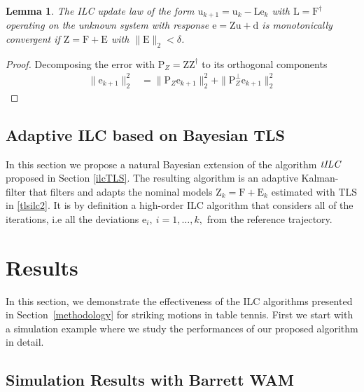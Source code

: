 \documentclass[10pt,a4paper]{article}
\theoremstyle{plain}
\newtheorem{lem}{Lemma}
\theoremstyle{definition}
\newcommand{\boldvec}[1]{\boldsymbol{\mathrm{#1}}}
\let\vec\boldvec
\newcommand{\error}{\vec{e}} %
\newcommand{\linDist}{\vec{d}} %
\newcommand{\sysInput}{\vec{u}} %
\newcommand{\latentMat}{\vec{Z}} %
\newcommand{\errorMat}{\vec{E}} %
\newcommand{\lmatrix}{\vec{L}} %
\newcommand{\systemMat}{\vec{F}} %
\newcommand{\projOrth}{\vec{P}_{Z}^{\perp}} %
\newcommand{\proj}{\vec{P}_{Z}} %
\newcommand{\alg}{\emph{tILC}}
\begin{document}
\begin{lem}
The ILC update law of the form $\sysInput_{k+1} = \sysInput_{k} - \lmatrix \error_{k}$ with $\lmatrix = \systemMat^{\dagger}$ operating on the unknown system with response $\error = \latentMat \sysInput + \linDist$ is monotonically convergent if $\latentMat = \systemMat + \errorMat$ with $\|\errorMat\|_2 < \delta$. 
\end{lem}
%
\begin{proof}
Decomposing the error with $\proj = \latentMat\latentMat^{\dagger}$ to its orthogonal components
\begin{align}
\|\error_{k+1}\|_2^2 &= \|\proj\error_{k+1}\|_2^2 + \|\projOrth\error_{k+1}\|_2^2
\end{align}
\end{proof}

\subsection{Adaptive ILC based on Bayesian TLS}\label{adaptiveILC}

In this section we propose a natural Bayesian extension of the algorithm $\alg$ proposed in Section \ref{ilcTLS}. The resulting algorithm is an adaptive Kalman-filter that filters and adapts the nominal models $\latentMat_k = \systemMat + \errorMat_k$ estimated with TLS in \eqref{tlsilc2}. It is by definition a high-order ILC algorithm that considers all of the iterations, i.e all the deviations $\error_i, \ i = 1, \ldots, k,$ from the reference trajectory. 



\section{Results}\label{results}

In this section, we demonstrate the effectiveness of the ILC algorithms presented in Section~\ref{methodology} for striking motions in table tennis. First we start with a simulation example where we study the performances of our proposed algorithm in detail.
%
\subsection{Simulation Results with Barrett WAM}
\end{document}
